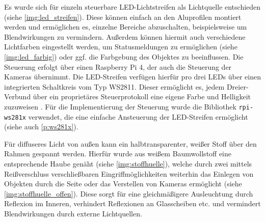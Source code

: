 \documentclass[./00PhotoBox.tex]{subfiles}
\begin{document}
Es wurde sich für einzeln steuerbare LED-Lichtstreifen als Lichtquelle entschieden (siehe \autoref{img:led_streifen}). Diese können einfach an den Aluprofilen montiert werden und ermöglichen es, einzelne Bereiche abzuschalten, beispielsweise um Blendwirkungen zu vermindern. Außerdem können hiermit auch verschiedene Lichtfarben eingestellt werden, um Statusmeldungen zu ermöglichen (siehe \autoref{img:led_farbig}) oder ggf. die Farbgebung des Objektes zu beeinflussen. Die Steuerung erfolgt über einen Raspberry Pi 4, der auch die Steuerung der Kameras übernimmt. Die LED-Streifen verfügen hierfür pro drei LEDs über einen integrierten Schaltkreis vom Typ WS2811. Dieser ermöglicht es, jedem Dreier-Verbund über ein proprietäres Steuerprotokoll eine eigene Farbe und Helligkeit zuzuweisen \citep{ws2811}. Für die Implementierung der Steuerung wurde die Bibliothek \texttt{rpi-ws281x} verwendet, die eine einfache Ansteuerung der LED-Streifen ermöglicht (siehe auch \autoref{p:ws281x}).

Für diffuseres Licht von außen kann ein halbtransparenter, weißer Stoff über den Rahmen gespannt werden. Hierfür wurde aus weißem Baumwollstoff eine entsprechende Haube genäht (siehe \autoref{img:stoffhuelle}), welche durch zwei mittels Reißverschluss verschließbaren Eingriffmöglichkeiten weiterhin das Einlegen von Objekten durch die Seite oder das Verstellen von Kameras ermöglicht (siehe \autoref{img:stoffhuelle_offen}). Diese sorgt für eine gleichmäßigere Ausleuchtung durch Reflexion im Inneren, verhindert Reflexionen an Glasscheiben etc. und vermindert Blendwirkungen durch externe Lichtquellen.
\end{document}
